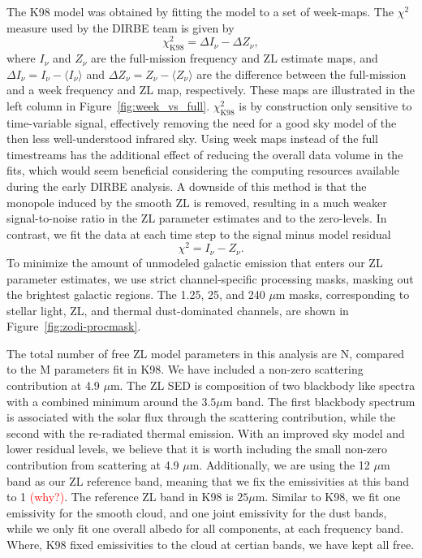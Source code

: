 \documentclass[twocolumn]{aa}
\begin{document}
The K98 model was obtained by fitting the model to a set of week-maps. 
The $\chi^2$ measure used by the DIRBE team is given by
\begin{equation}
    \chi^2_\mathrm{K98} = \Delta I_\nu - \Delta Z_\nu,
\end{equation}
where $I_\nu$ and $Z_\nu$ are the full-mission frequency and ZL estimate 
maps, and $\Delta I_\nu = I_\nu - \langle I_\nu \rangle$ and $\Delta Z_\nu = Z_\nu - \langle Z_\nu \rangle$ are the difference between 
the full-mission and a week frequency and ZL map, respectively. These 
maps are illustrated in the left column in Figure~\ref{fig:week_vs_full}. 
$\chi^2_\mathrm{K98}$ is by construction only sensitive to time-variable 
signal, effectively removing the need for a good sky model of the then 
less well-understood infrared sky. Using week maps instead of the full 
timestreams has the additional effect of reducing the overall data 
volume in the fits, which would seem beneficial considering the 
computing resources available during the early DIRBE analysis. A 
downside of this method is that the monopole induced by the smooth ZL is 
removed, resulting in a much weaker signal-to-noise ratio in the ZL 
parameter estimates and to the zero-levels. In contrast, we fit the data 
at each time step to the signal minus model residual
\begin{equation}\label{eq:chisq}
    \chi^2 = I_\nu - Z_\nu.
\end{equation}
To minimize the amount of unmodeled galactic emission that enters our 
ZL parameter estimates, we use strict channel-specific processing masks, 
masking out the brightest galactic regions. The 1.25, 25, and 240 $\mu$m 
masks, corresponding to stellar light, ZL, and thermal dust-dominated 
channels, are shown in Figure~\ref{fig:zodi-procmask}.




The total number of free ZL model parameters in this analysis are N, 
compared to the M parameters fit in K98. We have included a non-zero
scattering contribution at 4.9 $\mu$m. The ZL SED is composition of two
blackbody like spectra with a combined minimum around the $3.5\mu$m band. The first
blackbody spectrum is associated with the solar flux through the scattering 
contribution, while the second with the re-radiated thermal emission. With an
improved sky model and lower residual levels, we believe that it is worth 
including the small non-zero contribution from scattering at 4.9 $\mu$m.
Additionally, we are using the 12 $\mu$m band as our ZL reference band, meaning
that we fix the emissivities at this band to 1 \textcolor{red}{(why?)}. The
reference ZL band in K98 is $25 \mu$m. Similar to K98, we fit one emissivity 
for the smooth cloud, and one joint emissivity for the dust bands, while we 
only fit one overall albedo for all components, at each frequency band. Where,
K98 fixed emissivities to the cloud at certian bands, we have kept all free.
\end{document}
